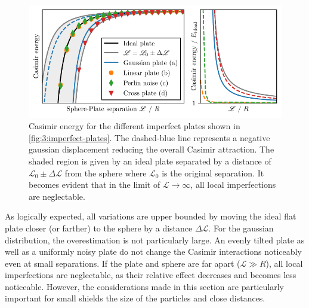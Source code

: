 \begin{figure}[!htbp]
  \centering
  \includegraphics[width=\textwidth]{../figures/casimir/casimir-potential-imperfect-plates-relative.pdf}
  \caption{Casimir energy for the different imperfect plates shown in \cref{fig:3:imperfect-plates}. The dashed-blue line represents a negative gaussian displacement reducing the overall Casimir attraction. The shaded region is given by an ideal plate separated by a distance of $\mathscr{L}_0 \pm \Delta\mathscr{L}$ from the sphere where $\mathscr{L}_0$ is the original separation. It becomes evident that in the limit of $\mathscr{L}\rightarrow\infty$, all local imperfections are neglectable.}
  \label{fig:3:casimir-imperfect-plates}
\end{figure}
As logically expected, all variations are upper bounded by moving the ideal flat plate closer (or farther) to the sphere by a distance $\Delta \mathscr{L}$.
For the gaussian distribution, the overestimation is not particularly large.
An evenly tilted plate as well as a uniformly noisy plate do not change the Casimir interactions noticeably even at small separations.
If the plate and sphere are far apart ($\mathscr{L} \gg R$), all local imperfections are neglectable, as their relative effect decreases and becomes less noticeable.
However, the considerations made in this section are particularly important for small shields the size of the particles and close distances.